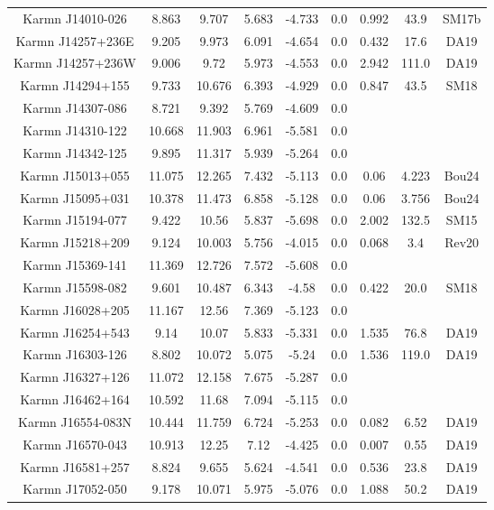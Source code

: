 \begin{longtable}{ccccccccc}
    Karmn J14010-026 & 8.863 & 9.707 & 5.683 & -4.733 & 0.0 & 0.992 & 43.9 & SM17b \\
    Karmn J14257+236E & 9.205 & 9.973 & 6.091 & -4.654 & 0.0 & 0.432 & 17.6 & DA19 \\
    Karmn J14257+236W & 9.006 & 9.72 & 5.973 & -4.553 & 0.0 & 2.942 & 111.0 & DA19 \\
    Karmn J14294+155 & 9.733 & 10.676 & 6.393 & -4.929 & 0.0 & 0.847 & 43.5 & SM18 \\
    Karmn J14307-086 & 8.721 & 9.392 & 5.769 & -4.609 & 0.0 &  &  &  \\
    Karmn J14310-122 & 10.668 & 11.903 & 6.961 & -5.581 & 0.0 &  &  &  \\
    Karmn J14342-125 & 9.895 & 11.317 & 5.939 & -5.264 & 0.0 &  &  &  \\
    Karmn J15013+055 & 11.075 & 12.265 & 7.432 & -5.113 & 0.0 & 0.06 & 4.223 & Bou24 \\
    Karmn J15095+031 & 10.378 & 11.473 & 6.858 & -5.128 & 0.0 & 0.06 & 3.756 & Bou24 \\
    Karmn J15194-077 & 9.422 & 10.56 & 5.837 & -5.698 & 0.0 & 2.002 & 132.5 & SM15 \\
    Karmn J15218+209 & 9.124 & 10.003 & 5.756 & -4.015 & 0.0 & 0.068 & 3.4 & Rev20 \\
    Karmn J15369-141 & 11.369 & 12.726 & 7.572 & -5.608 & 0.0 &  &  &  \\
    Karmn J15598-082 & 9.601 & 10.487 & 6.343 & -4.58 & 0.0 & 0.422 & 20.0 & SM18 \\
    Karmn J16028+205 & 11.167 & 12.56 & 7.369 & -5.123 & 0.0 &  &  &  \\
    Karmn J16254+543 & 9.14 & 10.07 & 5.833 & -5.331 & 0.0 & 1.535 & 76.8 & DA19 \\
    Karmn J16303-126 & 8.802 & 10.072 & 5.075 & -5.24 & 0.0 & 1.536 & 119.0 & DA19 \\
    Karmn J16327+126 & 11.072 & 12.158 & 7.675 & -5.287 & 0.0 &  &  &  \\
    Karmn J16462+164 & 10.592 & 11.68 & 7.094 & -5.115 & 0.0 &  &  &  \\
    Karmn J16554-083N & 10.444 & 11.759 & 6.724 & -5.253 & 0.0 & 0.082 & 6.52 & DA19 \\
    Karmn J16570-043 & 10.913 & 12.25 & 7.12 & -4.425 & 0.0 & 0.007 & 0.55 & DA19 \\
    Karmn J16581+257 & 8.824 & 9.655 & 5.624 & -4.541 & 0.0 & 0.536 & 23.8 & DA19 \\
    Karmn J17052-050 & 9.178 & 10.071 & 5.975 & -5.076 & 0.0 & 1.088 & 50.2 & DA19 \\

\end{longtable}

